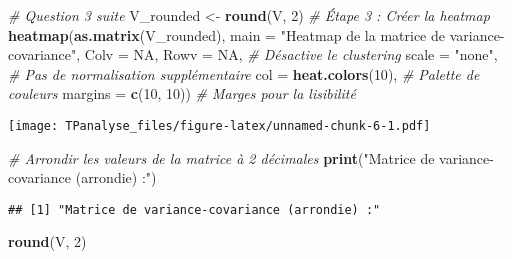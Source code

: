 \documentclass[
]{article}
\newenvironment{Shaded}{\begin{snugshade}}{\end{snugshade}}
\newcommand{\AttributeTok}[1]{\textcolor[rgb]{0.13,0.29,0.53}{#1}}
\newcommand{\CommentTok}[1]{\textcolor[rgb]{0.56,0.35,0.01}{\textit{#1}}}
\newcommand{\ConstantTok}[1]{\textcolor[rgb]{0.56,0.35,0.01}{#1}}
\newcommand{\DecValTok}[1]{\textcolor[rgb]{0.00,0.00,0.81}{#1}}
\newcommand{\FunctionTok}[1]{\textcolor[rgb]{0.13,0.29,0.53}{\textbf{#1}}}
\newcommand{\NormalTok}[1]{#1}
\newcommand{\OtherTok}[1]{\textcolor[rgb]{0.56,0.35,0.01}{#1}}
\newcommand{\StringTok}[1]{\textcolor[rgb]{0.31,0.60,0.02}{#1}}
\begin{document}
\begin{Shaded}
\begin{Highlighting}[]
\CommentTok{\#  Question 3 suite }
\NormalTok{V\_rounded }\OtherTok{\textless{}{-}} \FunctionTok{round}\NormalTok{(V, }\DecValTok{2}\NormalTok{)}
\CommentTok{\# Étape 3 : Créer la heatmap}
\FunctionTok{heatmap}\NormalTok{(}\FunctionTok{as.matrix}\NormalTok{(V\_rounded), }
        \AttributeTok{main =} \StringTok{"Heatmap de la matrice de variance{-}covariance"}\NormalTok{,}
        \AttributeTok{Colv =} \ConstantTok{NA}\NormalTok{, }\AttributeTok{Rowv =} \ConstantTok{NA}\NormalTok{,  }\CommentTok{\# Désactive le clustering}
        \AttributeTok{scale =} \StringTok{"none"}\NormalTok{,  }\CommentTok{\# Pas de normalisation supplémentaire}
        \AttributeTok{col =} \FunctionTok{heat.colors}\NormalTok{(}\DecValTok{10}\NormalTok{),  }\CommentTok{\# Palette de couleurs}
        \AttributeTok{margins =} \FunctionTok{c}\NormalTok{(}\DecValTok{10}\NormalTok{, }\DecValTok{10}\NormalTok{))  }\CommentTok{\# Marges pour la lisibilité}
\end{Highlighting}
\end{Shaded}

\texttt{[image: TPanalyse\_files/figure-latex/unnamed-chunk-6-1.pdf]}

\begin{Shaded}
\begin{Highlighting}[]
\CommentTok{\# Arrondir les valeurs de la matrice à 2 décimales}
\FunctionTok{print}\NormalTok{(}\StringTok{"Matrice de variance{-}covariance (arrondie) :"}\NormalTok{)}
\end{Highlighting}
\end{Shaded}

\begin{verbatim}
## [1] "Matrice de variance-covariance (arrondie) :"
\end{verbatim}

\begin{Shaded}
\begin{Highlighting}[]
\FunctionTok{round}\NormalTok{(V, }\DecValTok{2}\NormalTok{)}
\end{Highlighting}
\end{Shaded}
\end{document}
